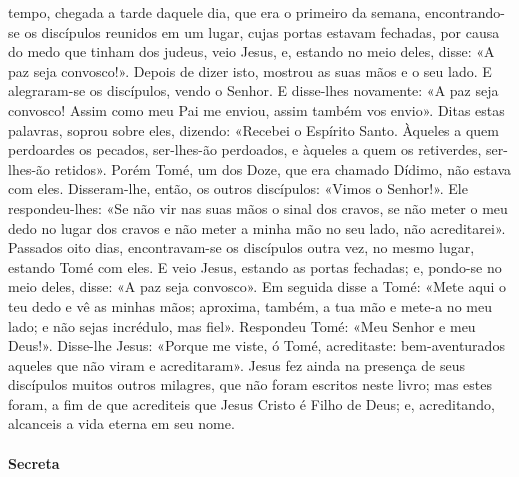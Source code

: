 \begin{paracol}{2}
{ tempo, chegada a tarde daquele dia, que era o primeiro da semana, encontrando-se os discípulos reunidos em um lugar, cujas portas estavam fechadas, por causa do medo que tinham dos judeus, veio Jesus, e, estando no meio deles, disse: «A paz seja convosco!». Depois de dizer isto, mostrou as suas mãos e o seu lado. E alegraram-se os discípulos, vendo o Senhor. E disse-lhes novamente: «A paz seja convosco! Assim como meu Pai me enviou, assim também vos envio». Ditas estas palavras, soprou sobre eles, dizendo: «Recebei o Espírito Santo. Àqueles a quem perdoardes os pecados, ser-lhes-ão perdoados, e àqueles a quem os retiverdes, ser-lhes-ão retidos». Porém Tomé, um dos Doze, que era chamado Dídimo, não estava com eles. Disseram-lhe, então, os outros discípulos: «Vimos o Senhor!». Ele respondeu-lhes: «Se não vir nas suas mãos o sinal dos cravos, se não meter o meu dedo no lugar dos cravos e não meter a minha mão no seu lado, não acreditarei». Passados oito dias, encontravam-se os discípulos outra vez, no mesmo lugar, estando Tomé com eles. E veio Jesus, estando as portas fechadas; e, pondo-se no meio deles, disse: «A paz seja convosco». Em seguida disse a Tomé: «Mete aqui o teu dedo e vê as minhas mãos; aproxima, também, a tua mão e mete-a no meu lado; e não sejas incrédulo, mas fiel». Respondeu Tomé: «Meu Senhor e meu Deus!». Disse-lhe Jesus: «Porque me viste, ó Tomé, acreditaste: bem-aventurados aqueles que não viram e acreditaram». Jesus fez ainda na presença de seus discípulos muitos outros milagres, que não foram escritos neste livro; mas estes foram, a fim de que acrediteis que Jesus Cristo é Filho de Deus; e, acreditando, alcanceis a vida eterna em seu nome.
}\end{paracol}

\begin{paracol}{2}\switchcolumn{}\end{paracol}

\paragraph{Secreta}
\begin{paracol}{2}\switchcolumn{}\end{paracol}

